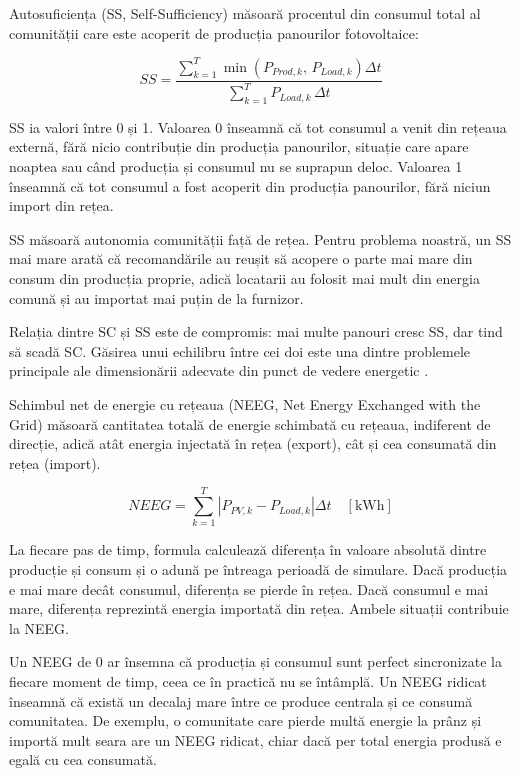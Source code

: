 \documentclass[12pt,a4paper]{report}
\begin{document}
Autosuficiența (SS, Self-Sufficiency) măsoară procentul din consumul total al comunității care este acoperit de producția panourilor fotovoltaice:

\begin{equation}
  SS = \frac{\displaystyle\sum_{k=1}^{T} \min\!\left(P_{Prod,k},\, P_{Load,k}\right) \Delta t}{\displaystyle\sum_{k=1}^{T} P_{Load,k}\, \Delta t}
  \label{eq:ss}
\end{equation}

SS ia valori între 0 și 1. Valoarea 0 înseamnă că tot consumul a venit din rețeaua externă, fără nicio contribuție din producția panourilor, situație care apare noaptea sau când producția și consumul nu se suprapun deloc. Valoarea 1 înseamnă că tot consumul a fost acoperit din producția panourilor, fără niciun import din rețea.

SS măsoară autonomia comunității față de rețea. Pentru problema noastră, un SS mai mare arată că recomandările au reușit să acopere o parte mai mare din consum din producția proprie, adică locatarii au folosit mai mult din energia comună și au importat mai puțin de la furnizor.

Relația dintre SC și SS este de compromis: mai multe panouri cresc SS, dar tind să scadă SC. Găsirea unui echilibru între cei doi este una dintre problemele principale ale dimensionării adecvate din punct de vedere energetic \cite{simoiu2021jcp}.

Schimbul net de energie cu rețeaua (NEEG, Net Energy Exchanged with the Grid) măsoară cantitatea totală de energie schimbată cu rețeaua, indiferent de direcție, adică atât energia injectată în rețea (export), cât și cea consumată din rețea (import).

\begin{equation}
  NEEG = \sum_{k=1}^{T} \left|P_{PV,k} - P_{Load,k}\right| \Delta t \quad [\text{kWh}]
  \label{eq:neeg}
\end{equation}

La fiecare pas de timp, formula calculează diferența în valoare absolută dintre producție și consum și o adună pe întreaga perioadă de simulare. Dacă producția e mai mare decât consumul, diferența se pierde în rețea. Dacă consumul e mai mare, diferența reprezintă energia importată din rețea. Ambele situații contribuie la NEEG.

Un NEEG de 0 ar însemna că producția și consumul sunt perfect sincronizate la fiecare moment de timp, ceea ce în practică nu se întâmplă. Un NEEG ridicat înseamnă că există un decalaj mare între ce produce centrala și ce consumă comunitatea. De exemplu, o comunitate care pierde multă energie la prânz și importă mult seara are un NEEG ridicat, chiar dacă per total energia produsă e egală cu cea consumată.
\end{document}

